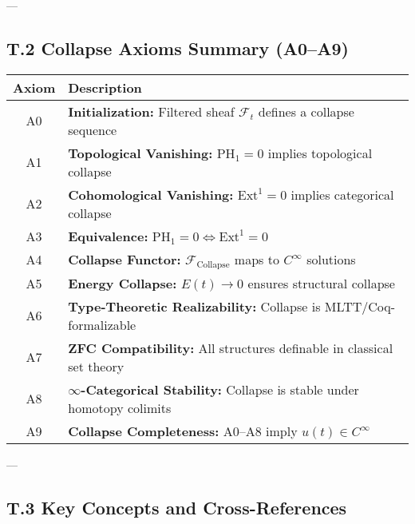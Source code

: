 \documentclass[11pt]{article}
\begin{document}
---

\subsection*{T.2 Collapse Axioms Summary (A0–A9)}

\begin{center}
\begin{tabular}{|c|p{10cm}|}
\hline
\textbf{Axiom} & \textbf{Description} \\
\hline
A0 & \textbf{Initialization:} Filtered sheaf $\mathcal{F}_t$ defines a collapse sequence \\
A1 & \textbf{Topological Vanishing:} $\mathrm{PH}_1 = 0$ implies topological collapse \\
A2 & \textbf{Cohomological Vanishing:} $\mathrm{Ext}^1 = 0$ implies categorical collapse \\
A3 & \textbf{Equivalence:} $\mathrm{PH}_1 = 0 \Leftrightarrow \mathrm{Ext}^1 = 0$ \\
A4 & \textbf{Collapse Functor:} $\mathcal{F}_{\mathrm{Collapse}}$ maps to $C^\infty$ solutions \\
A5 & \textbf{Energy Collapse:} $E(t) \to 0$ ensures structural collapse \\
A6 & \textbf{Type-Theoretic Realizability:} Collapse is MLTT/Coq-formalizable \\
A7 & \textbf{ZFC Compatibility:} All structures definable in classical set theory \\
A8 & \textbf{$\infty$-Categorical Stability:} Collapse is stable under homotopy colimits \\
A9 & \textbf{Collapse Completeness:} A0–A8 imply $u(t) \in C^\infty$ \\
\hline
\end{tabular}
\end{center}

---

\subsection*{T.3 Key Concepts and Cross-References}
\end{document}
